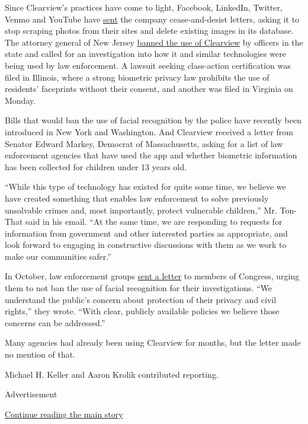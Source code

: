 Since Clearview's practices have come to light, Facebook, LinkedIn,
Twitter, Venmo and YouTube have
\href{https://www.nytimes.com/2020/01/22/technology/clearview-ai-twitter-letter.html}{sent}
the company cease-and-desist letters, asking it to stop scraping photos
from their sites and delete existing images in its database. The
attorney general of New Jersey
\href{https://www.nytimes.com/2020/01/24/technology/clearview-ai-new-jersey.html}{banned
the use of Clearview} by officers in the state and called for an
investigation into how it and similar technologies were being used by
law enforcement. A lawsuit seeking class-action certification was filed
in Illinois, where a strong biometric privacy law prohibits the use of
residents' faceprints without their consent, and another was filed in
Virginia on Monday.

Bills that would ban the use of facial recognition by the police have
recently been introduced in New York and Washington. And Clearview
received a letter from Senator Edward Markey, Democrat of Massachusetts,
asking for a list of law enforcement agencies that have used the app and
whether biometric information has been collected for children under 13
years old.

``While this type of technology has existed for quite some time, we
believe we have created something that enables law enforcement to solve
previously unsolvable crimes and, most importantly, protect vulnerable
children,'' Mr. Ton-That said in his email. ``At the same time, we are
responding to requests for information from government and other
interested parties as appropriate, and look forward to engaging in
constructive discussions with them as we work to make our communities
safer.''

In October, law enforcement groups
\href{https://www.ascia.org/pdf/news/le_group_letter_to_congress__facial_recogniton_technology__october_2019.pdf}{sent
a letter} to members of Congress, urging them to not ban the use of
facial recognition for their investigations. ``We understand the
public's concern about protection of their privacy and civil rights,''
they wrote. ``With clear, publicly available policies we believe those
concerns can be addressed.''

Many agencies had already been using Clearview for months, but the
letter made no mention of that.

Michael H. Keller and Aaron Krolik contributed reporting.

Advertisement

\protect\hyperlink{after-bottom}{Continue reading the main story}

